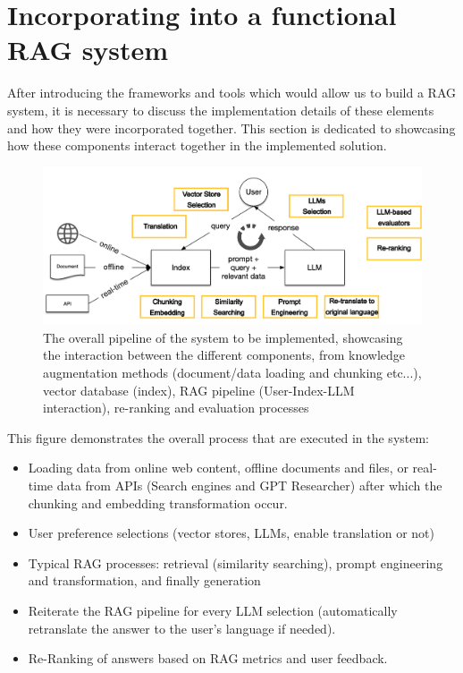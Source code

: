 \section{Incorporating into a functional RAG system}
After introducing the frameworks and tools which would allow us to build a RAG system, it is necessary to discuss the implementation details of these elements and how they were incorporated together.\newline
This section is dedicated to showcasing how these components interact together in the implemented solution.
\begin{figure}[htbp]
    \centering
    \includegraphics[width=\linewidth]{./figures/rag_components.png}
    \caption{The overall pipeline of the system to be implemented, showcasing the interaction between the different components, from knowledge augmentation methods (document/data loading and chunking etc...), vector database (index), RAG pipeline (User-Index-LLM interaction), re-ranking and evaluation processes}
\end{figure}\newline
This figure demonstrates the overall process that are executed in the system:
\begin{itemize}
    \item Loading data from online web content, offline documents and files, or real-time data from APIs (Search engines and GPT Researcher) after which the chunking and embedding transformation occur.
    \item User preference selections (vector stores, LLMs, enable translation or not)
    \item Typical RAG processes: retrieval (similarity searching), prompt engineering and transformation, and finally generation
    \item Reiterate the RAG pipeline for every LLM selection (automatically retranslate the answer to the user's language if needed).
    \item Re-Ranking of answers based on RAG metrics and user feedback.
\end{itemize}
\newpage

